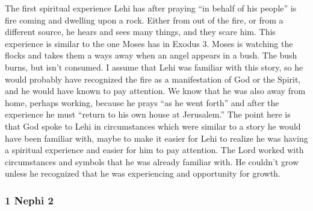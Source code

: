 		\begin{compactdesc}

		\item[4--7$\vert$]
		\begin{compactdesc}
		\item[God using what is already there to teach us] The first spiritual experience Lehi has after praying ``in behalf of his people'' is fire coming and dwelling upon a rock. Either from out of the fire, or from a different source, he hears and sees many things, and they scare him. This experience is similar to the one Moses has in Exodus 3. Moses is watching the flocks and takes them a ways away when an angel appears in a bush. The bush burns, but isn't consumed. I assume that Lehi was familiar with this story, so he would probably have recognized the fire as a manifestation of God or the Spirit, and he would have known to pay attention. We know that he was also away from home, perhaps working, because he prays ``as he went forth'' and after the experience he must ``return to his own house at Jerusalem.'' The point here is that God spoke to Lehi in circumstances which were similar to a story he would have been familiar with, maybe to make it easier for Lehi to realize he was having a spiritual experience and easier for him to pay attention. The Lord worked with circumstances and symbols that he was already familiar with. He couldn't grow unless he recognized that he was experiencing and opportunity for growth.
		\end{compactdesc}

		\end{compactdesc}

	\subsubsection{1 Nephi 2} %

